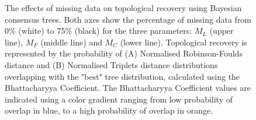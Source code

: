 \documentclass[12pt,letterpaper]{article}
\begin{document}
\begin{figure}
\caption{The effects of missing data on topological recovery using Bayesian consensus trees. Both axes show the percentage of missing data from 0\% (white) to 75\% (black) for the three parameters: $M_{L}$ (upper line), $M_{F}$ (middle line) and $M_{C}$ (lower line). Topological recovery is represented by the probability of (A) Normalised Robinson-Foulds distance and (B) Normalised Triplets distance distributions overlapping with the "best" tree distribution, calculated using the Bhattacharyya Coefficient. The Bhattacharyya Coefficient values are indicated using a color gradient ranging from low probability of overlap in blue, to a high probability of overlap in orange.
}
\label{Fig_Results-paircomp_within}
\end{figure}


\setcounter{figure}{0} \renewcommand{\thefigure}{\arabic{figure}}
\end{document}
